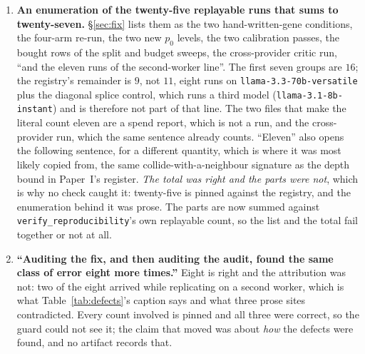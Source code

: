 \documentclass[11pt]{article}
\begin{document}
\begin{enumerate}
    Table~\ref{tab:results} lists as \emph{retained}. The count the sentence supports is
    unaffected, since two of the four non-zeros still sit above $1\sigma$, so this is a naming error, not a
    result. The multiple was also wrong: $\sigma$ multiples in this series are the exact $\dd$
    divided by the unrounded $\sigma$, which gives $3.23$, and $3.24$ is what the paper's own
    rounded $-0.094$ over a rounded $0.029$ gives. The check that should have caught it was fed the
    same rounded $0.094$, so both sides of the comparison descended from the display and it passed
    inside tolerance while the artifact's value failed. It now reads the run.
  \item \textbf{An enumeration of the twenty-five replayable runs that sums to twenty-seven.}
    \S\ref{sec:fix} lists them as the two hand-written-gene conditions, the four-arm re-run, the
    two new $p_0$ levels, the two calibration passes, the bought rows of the split and budget
    sweeps, the cross-provider critic run, ``and the eleven runs of the second-worker line''. The
    first seven groups are $16$; the registry's remainder is $9$, not $11$, eight runs on
    \texttt{llama-3.3-70b-versatile} plus the diagonal splice control, which runs a third model
    (\texttt{llama-3.1-8b-instant}) and is therefore not part of that line. The two files that
    make the literal count eleven are a spend report, which is not a run, and the cross-provider
    run, which the same sentence already counts. ``Eleven'' also opens the following sentence, for
    a different quantity, which is where it was most likely copied from, the same
    collide-with-a-neighbour signature as the depth bound in Paper~I's register. \emph{The total
    was right and the parts were not}, which is why no check caught it: twenty-five is pinned
    against the registry, and the enumeration behind it was prose. The parts are now summed
    against \texttt{verify\_reproducibility}'s own replayable count, so the list and the total
    fail together or not at all.
  \item \textbf{``Auditing the fix, and then auditing the audit, found the same class of error
    eight more times.''} Eight is right and the attribution was not: two of the eight arrived
    while replicating on a second worker, which is what Table~\ref{tab:defects}'s caption says
    and what three prose sites contradicted. Every count involved is pinned and all three were
    correct, so the guard could not see it; the claim that moved was about \emph{how} the
    defects were found, and no artifact records that.

\end{enumerate}
\end{document}
